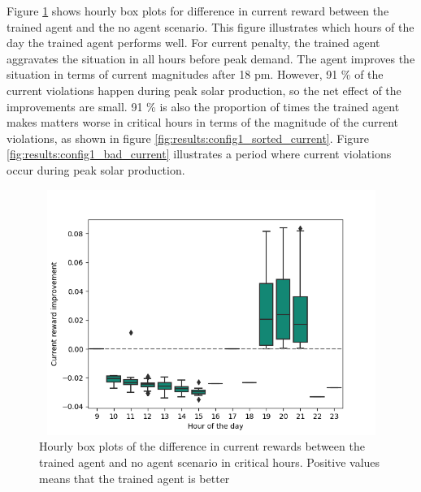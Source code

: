 \documentclass[class=book, crop=false, 11pt]{standalone}
\begin{document}
Figure \ref{fig:results:config1_improvement_current} shows hourly box plots for difference in current reward between the trained agent and the no agent scenario. This figure illustrates which hours of the day the trained agent performs well. For current penalty, the trained agent aggravates the situation in all hours before peak demand. The agent improves the situation in terms of current magnitudes after 18 pm. However, 91 \% of the current violations happen during peak solar production, so the net effect of the improvements are small. 91 \% is also the proportion of times the trained agent makes matters worse in critical hours in terms of the magnitude of the current violations, as shown in figure \ref{fig:results:config1_sorted_current}. Figure \ref{fig:results:config1_bad_current} illustrates a period where current violations occur during peak solar production.

\begin{figure}[h]
    \center
\includegraphics[height=8cm, width=12cm]{figures/config1_improvement_current.png}
    \caption {Hourly box plots of the difference in current rewards between the trained agent and no agent scenario in critical hours. Positive values means that the trained agent is better}
    \label{fig:results:config1_improvement_current}
\end{figure}
\end{document}
